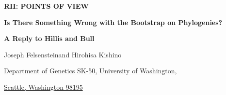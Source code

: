\def\baselinestretch{1.5}
\setlength{\topmargin}{0pt}
\setlength{\textheight}{570pt}
\setlength{\oddsidemargin}{0pt}
\setlength{\evensidemargin}{60pt}
\setlength{\textwidth}{427pt}
\setlength{\footheight}{0pt}
\setlength{\footskip}{30pt}
\parindent 25pt
\pagestyle{article}



\centerline{\bf RH: POINTS OF VIEW}
\bigskip

\centerline{\bf Is There Something Wrong with the Bootstrap on Phylogenies?}
\centerline{\bf A Reply to Hillis and Bull}
\bigskip

\centerline{Joseph Felsenstein\footnotemark[1] and Hirohisa Kishino\footnotemark[2]}
\bigskip


\centerline{\footnotemark[1]\underline{Department of Genetics SK-50, University of Washington,}}
\centerline{\underline{Seattle, Washington 98195}}
\medskip


